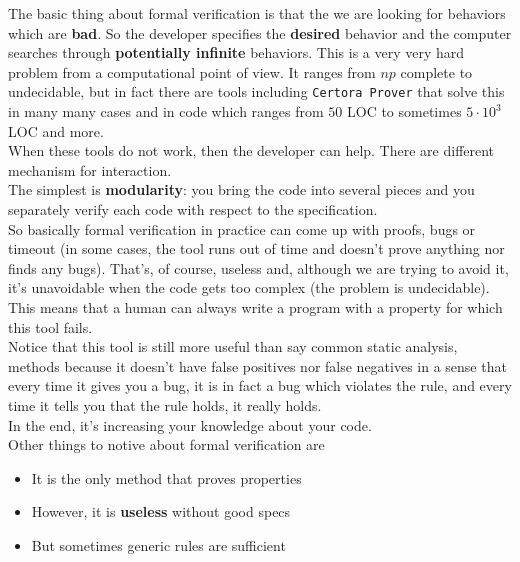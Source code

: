 \documentclass[oneside]{book}
\begin{document}
    The basic thing about formal verification is that the we are looking for behaviors which are \textbf{bad}.
    So the developer specifies the \textbf{desired} behavior and the computer searches through \textbf{potentially infinite} behaviors.
    This is a very very hard problem from a computational point of view.
    It ranges from $np$ complete to undecidable, but in fact there are tools including \texttt{Certora Prover} that solve this in many many cases and in code which ranges from $50$ LOC to sometimes $5\cdot 10^3$ LOC and more.\\

    When these tools do not work, then the developer can help.
    There are different mechanism for interaction.\\

    The simplest is \textbf{modularity}: you bring the code into several pieces and you separately verify each code with respect to the specification.\\

    So basically formal verification in practice can come up with proofs, bugs or timeout (in some cases, the tool runs out of time and doesn't prove anything nor finds any bugs).
    That's, of course, useless and, although we are trying to avoid it, it's unavoidable when the code gets too complex (the problem is undecidable).\\

    This means that a human can always write a program with a property for which this tool fails.\\

    Notice that this tool is still more useful than say common static analysis, methods because it doesn't have false positives nor false negatives in a sense that every time it gives you a bug, it is in fact a bug which violates the rule, and every time it tells you that the rule holds, it really holds.\\

    In the end, it's increasing your knowledge about your code.\\

    Other things to notive about formal verification are

    \begin{itemize}
        \item It is the only method that proves properties
        \item However, it is \textbf{useless} without good specs
        \item But sometimes generic rules are sufficient
    \end{itemize}
\end{document}
